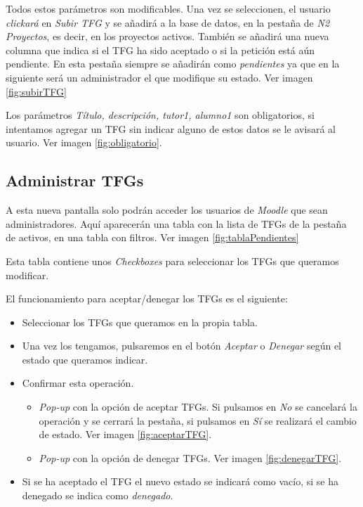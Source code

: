 Todos estos parámetros son modificables. Una vez se seleccionen, el usuario \emph{clickará} en \emph{Subir TFG} y se añadirá a la base de datos, en la pestaña de \emph{N2 Proyectos}, es decir, en los proyectos activos.
También se añadirá una nueva columna que indica si el TFG ha sido aceptado o si la petición está aún pendiente. En esta pestaña siempre se añadirán como \emph{pendientes} ya que en la siguiente será un administrador el que modifique su estado. Ver imagen \ref{fig:subirTFG}


Los parámetros \emph{Título, descripción, tutor1, alumno1} son obligatorios, si intentamos agregar un TFG sin indicar alguno de estos datos se le avisará al usuario. Ver imagen \ref{fig:obligatorio}.


\subsection{Administrar TFGs}

A esta nueva pantalla solo podrán acceder los usuarios de \emph{Moodle} que sean administradores.
Aquí aparecerán una tabla con la lista de TFGs de la pestaña de activos, en una tabla con filtros. Ver imagen \ref{fig:tablaPendientes}


Esta tabla contiene unos \emph{Checkboxes} para seleccionar los TFGs que queramos modificar.

El funcionamiento para aceptar/denegar los TFGs es el siguiente:
\begin{itemize}
	\item Seleccionar los TFGs que queramos en la propia tabla.
	\item Una vez los tengamos, pulsaremos en el botón \emph{Aceptar} o \emph{Denegar} según el estado que queramos indicar.
	\item Confirmar esta operación. 
	\begin{itemize}
		\item \emph{Pop-up} con la opción de aceptar TFGs. Si pulsamos en \emph{No} se cancelará la operación y se cerrará la pestaña, si pulsamos en \emph{Sí} se realizará el cambio de estado. Ver imagen \ref{fig:aceptarTFG}.
		\item \emph{Pop-up} con la opción de denegar TFGs. Ver imagen \ref{fig:denegarTFG}.
	\end{itemize}
	\item Si se ha aceptado el TFG el nuevo estado se indicará como vacío, si se ha denegado se indica como \emph{denegado}.
\end{itemize}

